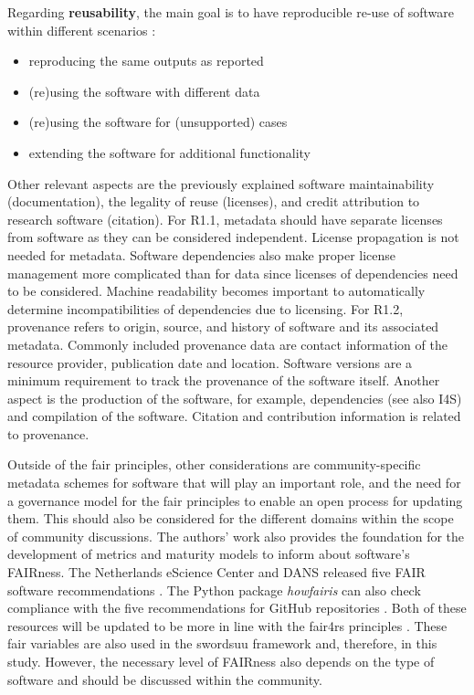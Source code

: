 Regarding \textbf{reusability}, the main goal is to have reproducible re-use of software within different scenarios \cite{benureau_re-run_2018}:
\begin{itemize}
    \item reproducing the same outputs as reported
    \item (re)using the software with different data
    \item (re)using the software for (unsupported) cases
    \item extending the software for additional functionality
\end{itemize}

Other relevant aspects are the previously explained software maintainability (documentation), the legality of reuse (licenses), and credit attribution to research software (citation). For R1.1, metadata should have separate licenses from software as they can be considered independent. License propagation is not needed for metadata. Software dependencies also make proper license management more complicated than for data since licenses of dependencies need to be considered. Machine readability becomes important to automatically determine incompatibilities of dependencies due to licensing. For R1.2, provenance refers to origin, source, and history of software and its associated metadata. Commonly included provenance data are contact information of the resource provider, publication date and location. Software versions are a minimum requirement to track the provenance of the software itself. Another aspect is the production of the software, for example, dependencies (see also I4S) and compilation of the software. Citation and contribution information is related to provenance.

Outside of the \acrshort{fair} principles, other considerations are community-specific metadata schemes for software that will play an important role, and the need for a governance model for the \acrshort{fair} principles to enable an open process for updating them. This should also be considered for the different domains within the scope of community discussions. The authors' work also provides the foundation for the development of metrics and maturity models to inform about software's FAIRness. 
The Netherlands eScience Center and DANS released five FAIR software recommendations \cite{noauthor_fair_nodate, martinez-ortiz_five_2020}. The Python package \textit{howfairis} can also check compliance with the five recommendations for GitHub repositories \cite{Spaaks_howfairis}. 
Both of these resources will be updated to be more in line with the \acrshort{fair4rs} principles \cite{martinez-ortiz_fair4rs_2022}. These \acrshort{fair} variables are also used in the \acrshort{swordsuu} framework and, therefore, in this study. However, the necessary level of FAIRness also depends on the type of software and should be discussed within the community. 


